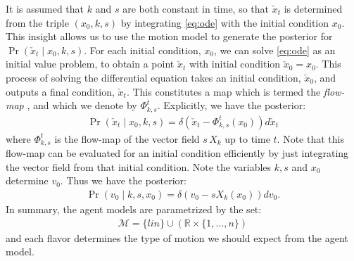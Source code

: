 \documentclass[letterpaper,10pt,conference]{ieeeconf}
\begin{document}
It is assumed that $k$ and $s$ are both constant in time, so that $\check{x}_t$ is determined from the triple $(x_0,k,s)$ by integrating \eqref{eq:ode} with the initial condition $x_0$.
This insight allows us to use the motion model to generate the posterior for $\Pr( \check{x}_t \mid x_0, k, s)$.
For each initial condition, $x_0$, we can solve \eqref{eq:ode} as an initial value problem, to obtain a point $\check{x}_t$ with initial condition $\check{x}_0 = x_0$.
This process of solving the differential equation takes an initial condition, $\check{x}_0$, and outputs a final condition, $\check{x}_t$.
This constitutes a map which is termed the \emph{flow-map} \cite[Ch 4]{MTA}, and which we denote by $\Phi_{k,s}^t$.
Explicitly, we have the posterior:
\begin{align}
	\Pr( \check{x}_t \mid x_0 , k , s) = \delta( \check{x}_t - \Phi^{t}_{k,s}( x_0) )  d\check{x}_t \label{eq:x_check | ksx}
\end{align}
where $\Phi^{t}_{k,s}$ is the flow-map of the vector field $s \,X_k$ up to time $t$.
Note that this flow-map can be evaluated for an initial condition efficiently by just integrating the vector field from that initial condition.
Note the variables $k,s$ and $x_0$ determine $v_0$.
Thus we have the posterior:
\begin{align}
	\Pr( v_0 \mid k, s, x_0) = \delta( v_0 -s X_k( x_0) ) dv_0. \label{eq:v | ksx}
\end{align}
In summary, the agent models are parametrized by the set:
\begin{align}
	\mathcal{M} = \{ lin \} \cup \left( \mathbb{R} \times \{ 1 , \dots, n \} \right) \label{eq:models}
\end{align}
and each flavor determines the type of motion we should expect from the agent model.
\end{document}
